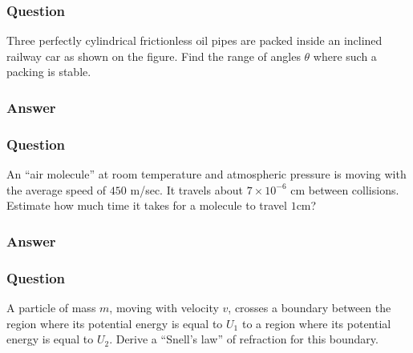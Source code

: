 \subsubsection{Question}

Three perfectly cylindrical frictionless oil pipes are packed inside an inclined railway car as shown on the figure. Find the range of angles $\theta$ where such a packing is stable.

\subsubsection{Answer}


\subsubsection{Question}
An ``air molecule'' at room temperature and atmospheric pressure is moving with the average speed of $450$ m/sec. It travels about $7\times10^{-6}$ cm between collisions. Estimate how much time it takes for a molecule to travel $1$cm?
\subsubsection{Answer}



\subsubsection{Question}
A particle of mass $m$, moving with velocity $v$, crosses a boundary between the region where its potential energy is equal to $U_1$ to a region where its potential energy is equal to $U_2$. Derive a ``Snell’s law'' of refraction for this boundary.
